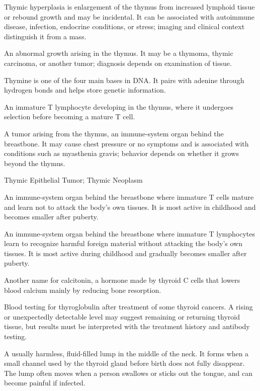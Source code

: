  Thymic hyperplasia is enlargement of the thymus from increased lymphoid tissue or rebound growth and may be incidental. It can be associated with autoimmune disease, infection, endocrine conditions, or stress; imaging and clinical context distinguish it from a mass.

 An abnormal growth arising in the thymus. It may be a thymoma, thymic carcinoma, or another tumor; diagnosis depends on examination of tissue.

 Thymine is one of the four main bases in DNA. It pairs with adenine through hydrogen bonds and helps store genetic information.

 An immature T lymphocyte developing in the thymus, where it undergoes selection before becoming a mature T cell.

 A tumor arising from the thymus, an immune-system organ behind the breastbone. It may cause chest pressure or no symptoms and is associated with conditions such as myasthenia gravis; behavior depends on whether it grows beyond the thymus.

\synonyms
Thymic Epithelial Tumor; Thymic Neoplasm

 An immune-system organ behind the breastbone where immature T cells mature and learn not to attack the body’s own tissues. It is most active in childhood and becomes smaller after puberty.

 An immune-system organ behind the breastbone where immature T lymphocytes learn to recognize harmful foreign material without attacking the body’s own tissues. It is most active during childhood and gradually becomes smaller after puberty.

 Another name for calcitonin, a hormone made by thyroid C cells that lowers blood calcium mainly by reducing bone resorption.

 Blood testing for thyroglobulin after treatment of some thyroid cancers. A rising or unexpectedly detectable level may suggest remaining or returning thyroid tissue, but results must be interpreted with the treatment history and antibody testing.

 A usually harmless, fluid-filled lump in the middle of the neck. It forms when a small channel used by the thyroid gland before birth does not fully disappear. The lump often moves when a person swallows or sticks out the tongue, and can become painful if infected.

